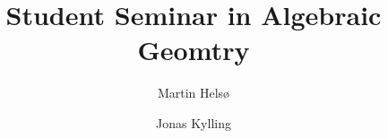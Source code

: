 \documentclass[a4paper, UKenglish]{report}
\title
{
    \bfseries\sffamily 
    Student Seminar in Algebraic Geomtry
}
\author
{
    Martin Hels\o
    \and
    Jonas Kylling
}
\begin{document}
\maketitle
\cite{test}

\clearpage
\printbibliography
\end{document}
